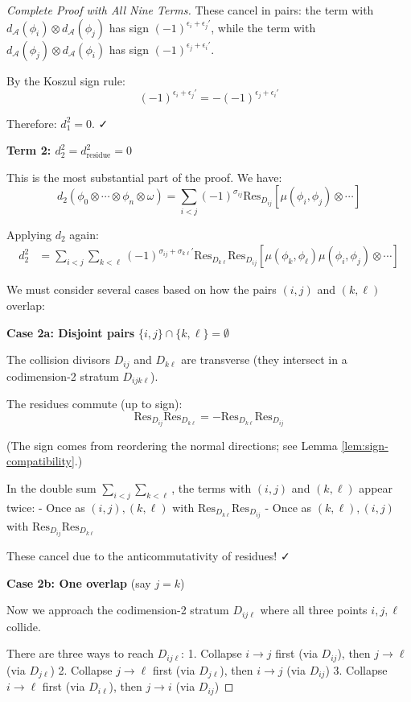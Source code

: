 \begin{proof}[Complete Proof with All Nine Terms]
These cancel in pairs: the term with $d_\mathcal{A}(\phi_i) \otimes d_\mathcal{A}(\phi_j)$ has sign $(-1)^{\epsilon_i + \epsilon_j'}$, while the term with $d_\mathcal{A}(\phi_j) \otimes d_\mathcal{A}(\phi_i)$ has sign $(-1)^{\epsilon_j + \epsilon_i'}$.

By the Koszul sign rule:
$$(-1)^{\epsilon_i + \epsilon_j'} = -(-1)^{\epsilon_j + \epsilon_i'}$$

Therefore: $d_1^2 = 0$. ✓

\medskip
\noindent\textbf{Term 2: $d_2^2 = d_{\text{residue}}^2 = 0$}

This is the most substantial part of the proof. We have:
$$d_2(\phi_0 \otimes \cdots \otimes \phi_n \otimes \omega) = \sum_{i<j} (-1)^{\sigma_{ij}} \text{Res}_{D_{ij}}[\mu(\phi_i, \phi_j) \otimes \cdots]$$

Applying $d_2$ again:
\begin{align*}
d_2^2 &= \sum_{i<j} \sum_{k<\ell} (-1)^{\sigma_{ij} + \sigma_{k\ell}'} \text{Res}_{D_{k\ell}} \text{Res}_{D_{ij}}[\mu(\phi_k, \phi_\ell) \mu(\phi_i, \phi_j) \otimes \cdots]
\end{align*}

We must consider several cases based on how the pairs $(i,j)$ and $(k,\ell)$ overlap:

\textbf{Case 2a: Disjoint pairs} $\{i,j\} \cap \{k,\ell\} = \emptyset$

The collision divisors $D_{ij}$ and $D_{k\ell}$ are transverse (they intersect in a codimension-2 stratum $D_{ijk\ell}$).

The residues commute (up to sign):
$$\text{Res}_{D_{ij}} \text{Res}_{D_{k\ell}} = -\text{Res}_{D_{k\ell}} \text{Res}_{D_{ij}}$$

(The sign comes from reordering the normal directions; see Lemma \ref{lem:sign-compatibility}.)

In the double sum $\sum_{i<j}\sum_{k<\ell}$, the terms with $(i,j)$ and $(k,\ell)$ appear twice:
- Once as $(i,j), (k,\ell)$ with $\text{Res}_{D_{k\ell}} \text{Res}_{D_{ij}}$
- Once as $(k,\ell), (i,j)$ with $\text{Res}_{D_{ij}} \text{Res}_{D_{k\ell}}$

These cancel due to the anticommutativity of residues! ✓

\textbf{Case 2b: One overlap} (say $j = k$)

Now we approach the codimension-2 stratum $D_{ij\ell}$ where all three points $i, j, \ell$ collide.

There are three ways to reach $D_{ij\ell}$:
1. Collapse $i \to j$ first (via $D_{ij}$), then $j \to \ell$ (via $D_{j\ell}$)
2. Collapse $j \to \ell$ first (via $D_{j\ell}$), then $i \to j$ (via $D_{ij}$)
3. Collapse $i \to \ell$ first (via $D_{i\ell}$), then $j \to i$ (via $D_{ij}$)


\end{proof}
